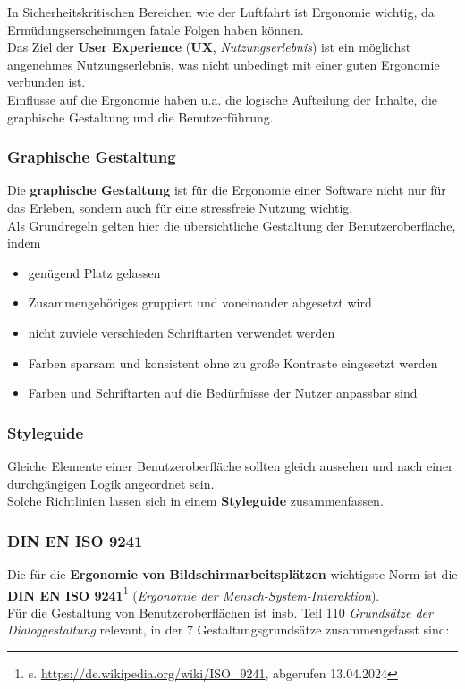 \noindent
In Sicherheitskritischen Bereichen wie der Luftfahrt ist Ergonomie wichtig, da Ermüdungserscheinungen fatale Folgen haben können.\\

\noindent
Das Ziel der \textbf{User Experience} (\textbf{UX}, \textit{Nutzungserlebnis}) ist ein möglichst angenehmes Nutzungserlebnis, was nicht unbedingt mit einer guten Ergonomie verbunden ist.\\

\noindent
Einflüsse auf die Ergonomie haben u.a. die logische Aufteilung der Inhalte, die graphische Gestaltung und die Benutzerführung.

\subsubsection*{Graphische Gestaltung}
Die \textbf{graphische Gestaltung} ist für die Ergonomie einer Software nicht nur für das Erleben, sondern auch für eine stressfreie Nutzung wichtig.\\

\noindent
Als Grundregeln gelten hier die übersichtliche Gestaltung der Benutzeroberfläche, indem

\begin{itemize}
    \item genügend Platz gelassen
    \item Zusammengehöriges gruppiert und voneinander abgesetzt wird
    \item nicht zuviele verschieden Schriftarten verwendet werden
    \item Farben sparsam und konsistent ohne zu große Kontraste eingesetzt werden
    \item Farben und Schriftarten auf die Bedürfnisse der Nutzer anpassbar sind
\end{itemize}

\subsubsection*{Styleguide}
Gleiche Elemente einer Benutzeroberfläche sollten gleich aussehen und nach einer durchgängigen Logik angeordnet sein.\\
Solche Richtlinien lassen sich in einem \textbf{Styleguide} zusammenfassen.

\subsubsection*{DIN EN ISO 9241}
Die für die \textbf{Ergonomie von Bildschirmarbeitsplätzen} wichtigste Norm ist die \textbf{DIN EN ISO 9241}\footnote{
s. \url{https://de.wikipedia.org/wiki/ISO_9241}, abgerufen 13.04.2024
} (\textit{Ergonomie der Mensch-System-Interaktion}).\\
Für die Gestaltung von Benutzeroberflächen ist insb. Teil 110 \textit{Grundsätze der Dialoggestaltung} relevant, in der 7 Gestaltungsgrundsätze zusammengefasst sind:

